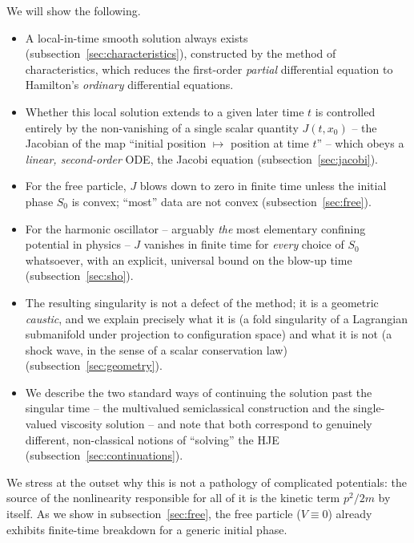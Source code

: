 We will show the following.
\begin{itemize}
\item[(i)] A local-in-time smooth solution always exists
    (subsection~\ref{sec:characteristics}), constructed by the method of
        characteristics, which reduces the first-order \emph{partial}
        differential equation to Hamilton's \emph{ordinary} differential
        equations.
\item[(ii)] Whether this local solution extends to a given later time $t$ is
    controlled entirely by the non-vanishing of a single scalar quantity
        $J(t,x_0)$ -- the Jacobian of the map ``initial position $\mapsto$
        position at time $t$'' -- which obeys a \emph{linear, second-order}
        ODE, the Jacobi equation (subsection~\ref{sec:jacobi}).
\item[(iii)] For the free particle, $J$ blows down to zero in finite time
    unless the initial phase $S_0$ is convex; ``most'' data are not convex
        (subsection~\ref{sec:free}).
\item[(iv)] For the harmonic oscillator -- arguably \emph{the} most elementary
    confining potential in physics -- $J$ vanishes in finite time for
        \emph{every} choice of $S_0$ whatsoever, with an explicit, universal
        bound on the blow-up time (subsection~\ref{sec:sho}).
\item[(v)] The resulting singularity is not a defect of the method; it is a
    geometric \emph{caustic}, and we explain precisely what it is (a fold
        singularity of a Lagrangian submanifold under projection to
        configuration space) and what it is not (a shock wave, in the sense of
        a scalar conservation law) (subsection~\ref{sec:geometry}).
\item[(vi)] We describe the two standard ways of continuing the solution past
    the singular time -- the multivalued semiclassical construction and the
        single-valued viscosity solution -- and note that both correspond to
        genuinely different, non-classical notions of ``solving'' the HJE
        (subsection~\ref{sec:continuations}).
\end{itemize}

We stress at the outset why this is not a pathology of complicated potentials:
the source of the nonlinearity responsible for all of it is the kinetic term
$p^2/2m$ by itself. As we show in subsection~\ref{sec:free}, the free particle
($V\equiv 0$) already exhibits finite-time breakdown for a generic initial
phase.

